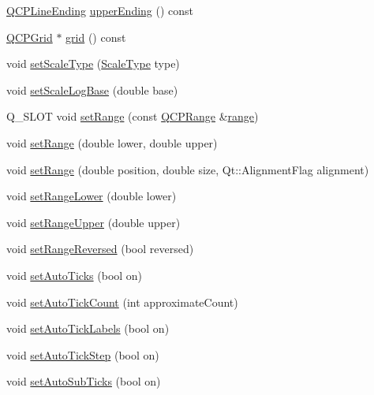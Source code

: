 \begin{DoxyCompactItemize}
\item 
\hyperlink{class_q_c_p_line_ending}{Q\-C\-P\-Line\-Ending} \hyperlink{class_q_c_p_axis_aad503ac95ee34e614ffee0bd66473e1a}{upper\-Ending} () const 
\item 
\hyperlink{class_q_c_p_grid}{Q\-C\-P\-Grid} $\ast$ \hyperlink{class_q_c_p_axis_ac4fb913cce3072b5e75a4635e0f6cd04}{grid} () const 
\item 
void \hyperlink{class_q_c_p_axis_adb6c5c45bdf899ea221881dd3b43b406}{set\-Scale\-Type} (\hyperlink{class_q_c_p_axis_a36d8e8658dbaa179bf2aeb973db2d6f0}{Scale\-Type} type)
\item 
void \hyperlink{class_q_c_p_axis_a726186054be90487885a748aa1b42188}{set\-Scale\-Log\-Base} (double base)
\item 
Q\-\_\-\-S\-L\-O\-T void \hyperlink{class_q_c_p_axis_aebdfea5d44c3a0ad2b4700cd4d25b641}{set\-Range} (const \hyperlink{class_q_c_p_range}{Q\-C\-P\-Range} \&\hyperlink{class_q_c_p_axis_ab1ea79a4f5ea4cf42620f8f51c477ac4}{range})
\item 
void \hyperlink{class_q_c_p_axis_a57d6ee9e9009fe88cb19db476ec70bca}{set\-Range} (double lower, double upper)
\item 
void \hyperlink{class_q_c_p_axis_acf60e5b2d631fbc8c4548c3d579cb6d0}{set\-Range} (double position, double size, Qt\-::\-Alignment\-Flag alignment)
\item 
void \hyperlink{class_q_c_p_axis_afcf51227d337db28d1a9ce9a4d1bc91a}{set\-Range\-Lower} (double lower)
\item 
void \hyperlink{class_q_c_p_axis_acd3ca1247aa867b540cd5ec30ccd3bef}{set\-Range\-Upper} (double upper)
\item 
void \hyperlink{class_q_c_p_axis_a2172fdb196b1a0dc3f40992fcad8e9e1}{set\-Range\-Reversed} (bool reversed)
\item 
void \hyperlink{class_q_c_p_axis_ae867c23d3a6a7bd4d09cc66c5d018f63}{set\-Auto\-Ticks} (bool on)
\item 
void \hyperlink{class_q_c_p_axis_a7c7111cbeac9ec5fcb40f93a1ef51a0b}{set\-Auto\-Tick\-Count} (int approximate\-Count)
\item 
void \hyperlink{class_q_c_p_axis_aaa47e3a6bac0c20d4beb9028f01bc1a1}{set\-Auto\-Tick\-Labels} (bool on)
\item 
void \hyperlink{class_q_c_p_axis_a99fe77b034e06f5b723995beab96e741}{set\-Auto\-Tick\-Step} (bool on)
\item 
void \hyperlink{class_q_c_p_axis_adcbdec7a60054b88571e89599f4a45bf}{set\-Auto\-Sub\-Ticks} (bool on)
\item 

\end{DoxyCompactItemize}
